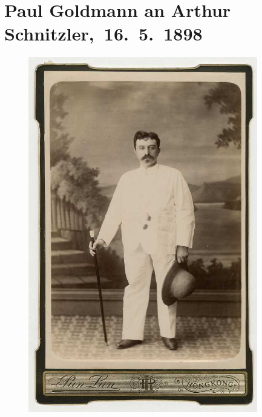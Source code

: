 

         
         \renewcommand{\erwaehntePersonen}{Personen:  ?? [Chinesischer Fotograf], Richard Beer-Hofmann, Louis Philipp Friedmann, Rose Friedmann, Paul Goldmann, Hugo von Hofmannsthal, Marie Reinhard, Arthur Rosthorn, Leo Van-Jung, Alice Ziegler}
         \renewcommand{\erwaehnteInstitutionen}{Institutionen: Pun lun}
         \renewcommand{\erwaehnteOrte}{Orte: Bad Gastein, China, Deutsches Postamt in Shanghai, Deutschland, Europa, Graz, Guangzhou, Hong Kong, Hongkong Hotel, Italien, München, Peking, Prag, Salzburg, Schweiz, Shanghai, Tegernsee, Wien}
         \renewcommand{\erwaehnteWerke}{Werke: Paul Goldmann, Tagebuch}
               \section[ Paul Goldmann an Arthur Schnitzler, 16. 5. 1898]{ Paul Goldmann an Arthur Schnitzler, 16. 5. 1898}\nopagebreak{}\rehead{ }\begin{ledgroupsized}[t]{13cm}\normalsize\beginnumbering \toendnotes[C]{\smallbreak\pagebreak[2]} 
\toendnotes[C]{\smallbreak}\begin{figure}[H]\centering\includegraphics[width=10cm]{../tex-inputs/img/img6272-46.jpg}\end{figure}\pstart

\end{ledgroupsized}
